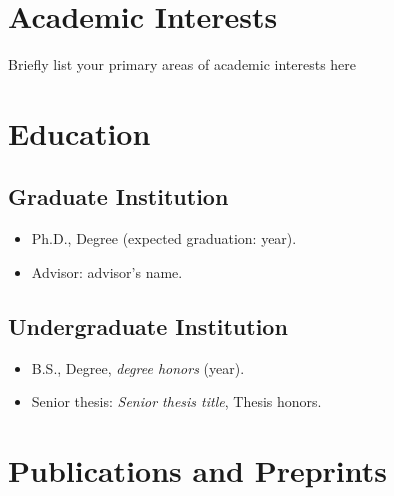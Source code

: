 \documentclass{cv_style}
\begin{document}

    \begin{center}  

    
	\end{center}
	
	\section{Academic Interests}
	Briefly list your primary areas of academic interests here

	\section{Education}
		\subsection{Graduate Institution}
				\begin{itemize}
					\item Ph.D., Degree (expected graduation: year).
					\item Advisor: advisor's name.
				\end{itemize}
				
		\subsection{Undergraduate Institution}
				\begin{itemize}
					\item B.S., Degree, \textit{degree honors} (year).
					\item Senior thesis: {\em Senior thesis title}, Thesis honors.
				\end{itemize}
		

	\section{Publications and Preprints}
		\begin{etaremune}			
					\item {}
							
					\item {}
					
		\end{etaremune}
		
\end{document}
